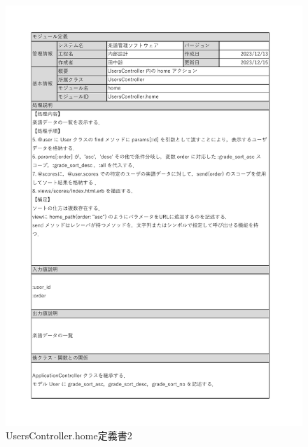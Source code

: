 \begin{figure}
	\centering
	\includegraphics[scale=0.6]{img/Users/xlsx/UsersController_home_2.pdf}
	\vspace{-1cm}
	\caption{UsersController.home定義書2}
\end{figure}


\clearpage

